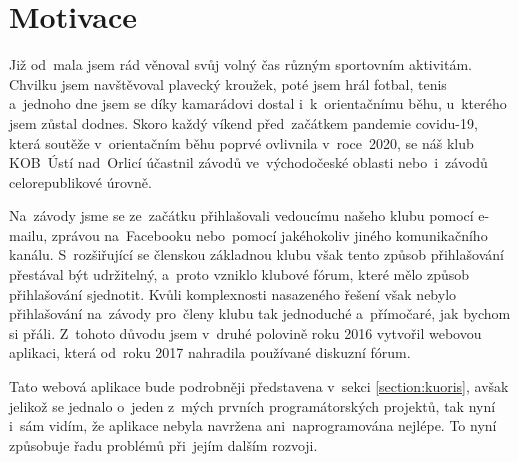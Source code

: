 \section{Motivace}\label{section:motivation}
Již od~mala jsem rád věnoval svůj volný čas různým sportovním aktivitám. Chvilku jsem navštěvoval plavecký kroužek, poté jsem hrál fotbal, tenis a~jednoho dne jsem se díky kamarádovi dostal i~k~orientačnímu běhu, u~kterého jsem zůstal dodnes. Skoro každý víkend před~začátkem pandemie covidu-19, která soutěže v~orientačním běhu poprvé ovlivnila v~roce~2020, se náš klub KOB~Ústí nad~Orlicí účastnil závodů ve~východočeské oblasti nebo~i~závodů celorepublikové úrovně.

Na~závody jsme se ze~začátku přihlašovali vedoucímu našeho klubu pomocí e-mailu, zprávou na~Facebooku nebo~pomocí jakéhokoliv jiného komunikačního kanálu. S~rozšiřující se členskou základnou klubu však tento způsob přihlašování přestával být udržitelný, a~proto vzniklo klubové fórum, které mělo způsob přihlašování sjednotit. Kvůli komplexnosti nasazeného řešení však nebylo přihlašování na~závody pro~členy klubu tak jednoduché a~přímočaré, jak bychom si přáli. Z~tohoto důvodu jsem v~druhé polovině roku 2016 vytvořil webovou aplikaci, která od~roku 2017 nahradila používané diskuzní fórum.

Tato webová aplikace bude podrobněji představena v~sekci \ref{section:kuoris}, avšak jelikož se jednalo o~jeden z~mých prvních programátorských projektů, tak nyní i~sám vidím, že aplikace nebyla navržena ani~naprogramována nejlépe. To nyní způsobuje řadu problémů při~jejím dalším rozvoji.
